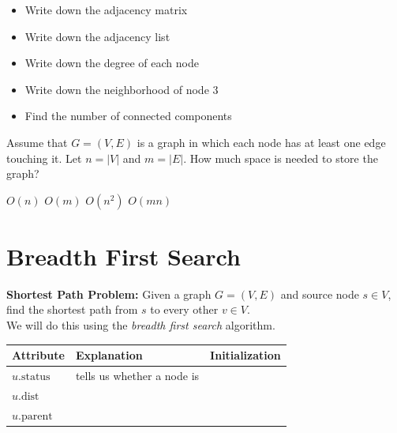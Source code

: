 \documentclass[11  pt]{exam}
\begin{document}
	\vs{8cm}
	
	
	\begin{itemize}
		\item Write down the adjacency matrix
		\item Write down the adjacency list 
		\item Write down the degree of each node
		\item Write down the neighborhood of node $3$
		\item Find the number of connected components
	\end{itemize}
	\begin{Qu}
		Assume that $G = (V,E)$ is a graph in which each node has at least one edge touching it. Let $n = |V|$ and $m = |E|$. How much space is needed to store the graph?
		\begin{itemize}
			\aitem $O(n)$ 
			\bitem $O(m)$
			\citem $O(n^2)$
			\ditem $O(mn)$
		\end{itemize}
	\end{Qu}
	\newpage
	
	\section{Breadth First Search}
	\textbf{Shortest Path Problem:} Given a graph $G = (V,E)$ and source node $s \in V$, find the shortest path from  $s$ to every other $v \in V$. \\
	
	
	We will do this using the \emph{breadth first search} algorithm.
	
	\begin{tabular}{| l | p{8cm} | p{6cm} |}
		\hline
		Attribute & Explanation &Initialization \\
		\hline
		$u.\text{status}$ & tells us whether a node is \phantom{a a a undiscovered} \phantom{discovered}  \phantom{explored} &  \\
		\hline
		$u.\text{dist}$ & \phantom{distance from node $s$ a a a a a a a a space here}
		\phantom{for more writing later on in the dell you know}&  \\
		\hline
		$u.\text{parent}$ & \phantom{predecessor/``discoverer" of $u$ s a a a a a  here} \phantom{for more writing later on in the dell you know}& \\
		\hline
	\end{tabular}
	
\end{document}
